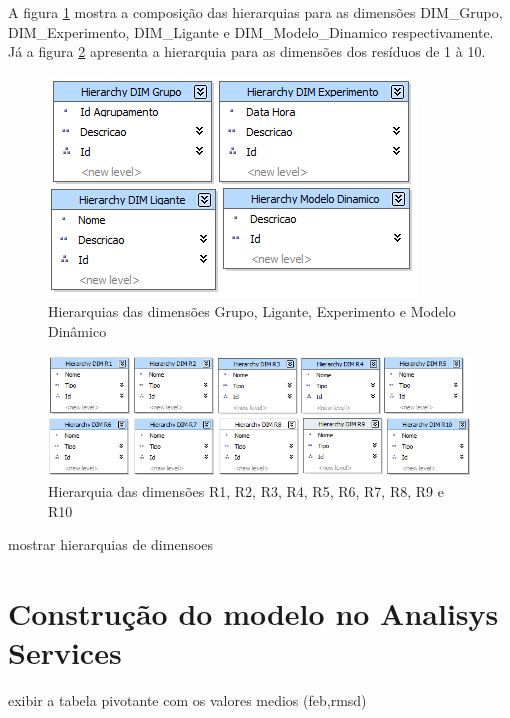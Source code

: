A figura \ref{fig:hierarGrupoLiganteExperimentoModelo} mostra a composição das hierarquias para as dimensões DIM\_Grupo, DIM\_Experimento, DIM\_Ligante e DIM\_Modelo\_Dinamico respectivamente. Já a figura \ref{fig:HierarR1ateR10} apresenta a hierarquia para as dimensões dos resíduos de 1 à 10.

\begin{figure}[h]
        \center
        \includegraphics[scale=0.6]{images/Hierar_Grupo_Ligante_Experimento_Modelo.png}
        \caption{Hierarquias das dimensões Grupo, Ligante, Experimento e Modelo Dinâmico}
        \label{fig:hierarGrupoLiganteExperimentoModelo}
\end{figure}

\begin{figure}[h]
        \center
        \includegraphics[scale=0.6]{images/Hierar_DIMR1_ate_10.png}
        \caption{Hierarquia das dimensões R1, R2, R3, R4, R5, R6, R7, R8, R9 e R10}
        \label{fig:HierarR1ateR10}
\end{figure}

mostrar hierarquias de dimensoes
	
\section{Construção do modelo no Analisys Services}
	exibir a tabela pivotante com os valores medios (feb,rmsd)
